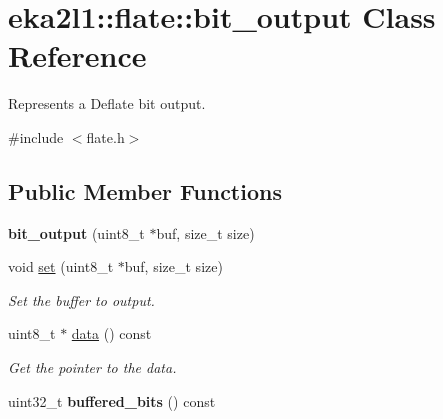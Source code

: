 \hypertarget{classeka2l1_1_1flate_1_1bit__output}{}\section{eka2l1\+:\+:flate\+:\+:bit\+\_\+output Class Reference}
\label{classeka2l1_1_1flate_1_1bit__output}


Represents a Deflate bit output.  




{\ttfamily \#include $<$flate.\+h$>$}

\subsection*{Public Member Functions}
\begin{DoxyCompactItemize}
\item 
\mbox{\label{classeka2l1_1_1flate_1_1bit__output_a7b0c39cfea8a08af50ba57f2f58db444}} 
{\bfseries bit\+\_\+output} (uint8\+\_\+t $\ast$buf, size\+\_\+t size)
\item 
\mbox{\label{classeka2l1_1_1flate_1_1bit__output_aba54a721ba259a238a0dc98963f5037c}} 
void \mbox{\hyperlink{classeka2l1_1_1flate_1_1bit__output_aba54a721ba259a238a0dc98963f5037c}{set}} (uint8\+\_\+t $\ast$buf, size\+\_\+t size)
\begin{DoxyCompactList}\small\item\em Set the buffer to output. \end{DoxyCompactList}\item 
\mbox{\label{classeka2l1_1_1flate_1_1bit__output_a05e851f45aec2e6dedd0f842760ce0da}} 
uint8\+\_\+t $\ast$ \mbox{\hyperlink{classeka2l1_1_1flate_1_1bit__output_a05e851f45aec2e6dedd0f842760ce0da}{data}} () const
\begin{DoxyCompactList}\small\item\em Get the pointer to the data. \end{DoxyCompactList}\item 
\mbox{\label{classeka2l1_1_1flate_1_1bit__output_a500617477ef9811de8374806952b8291}} 
uint32\+\_\+t {\bfseries buffered\+\_\+bits} () const
\item 

\end{DoxyCompactItemize}
